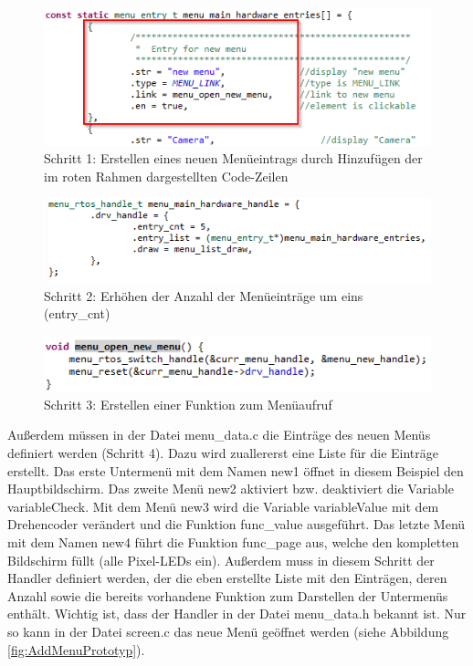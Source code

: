 \begin{figure}[H] %
\includegraphics[width=.75\textwidth]{sec6/images/AddMenu1} 
\centering
\captionsetup{width=.95\textwidth}
\caption[Schritt 1: Erstellen eines neuen Menüeintrags]{Schritt 1: Erstellen eines neuen Menüeintrags durch Hinzufügen der im roten Rahmen dargestellten Code-Zeilen}\centering
\label{fig:AddMenu1}
\end{figure}
\begin{figure}[H] %
\includegraphics[width=.75\textwidth]{sec6/images/AddMenu2} 
\centering
\captionsetup{width=.95\textwidth}
\caption[Schritt 2: Erhöhen der Anzahl der Menüeinträge um eins]{Schritt 2: Erhöhen der Anzahl der Menüeinträge um eins (entry\_cnt)}\centering
\label{fig:AddMenu2}
\end{figure}
\begin{figure}[H] %
\includegraphics[width=.75\textwidth]{sec6/images/AddMenuFunktion} 
\centering
\captionsetup{width=.95\textwidth}
\caption[Schritt 3: Erstellen einer Funktion zum Menüaufruf]{Schritt 3: Erstellen einer Funktion zum Menüaufruf}\centering
\label{fig:AddMenuFunktion}
\end{figure}

Außerdem müssen in der Datei \glqq menu\_data.c\grqq{} die Einträge des neuen Menüs definiert werden (Schritt 4). Dazu wird zuallererst eine Liste für die Einträge erstellt. Das erste Untermenü mit dem Namen \glqq new1\grqq{} öffnet in diesem Beispiel den Hauptbildschirm. Das zweite Menü \glqq new2\grqq{} aktiviert bzw. deaktiviert die Variable \glqq variableCheck\grqq{}. Mit dem Menü \glqq new3\grqq{} wird die Variable \glqq variableValue\grqq{} mit dem Drehencoder verändert und die Funktion \glqq func\_value\grqq{} ausgeführt. Das letzte Menü mit dem Namen \glqq new4\grqq{} führt die Funktion \glqq func\_page\grqq{} aus, welche den kompletten Bildschirm füllt (alle Pixel-LEDs ein). Außerdem muss in diesem Schritt der Handler definiert werden, der die eben erstellte Liste mit den Einträgen, deren Anzahl sowie die bereits vorhandene Funktion zum Darstellen der Untermenüs enthält. Wichtig ist, dass der Handler in der Datei \glqq menu\_data.h\grqq{} bekannt ist. Nur so kann in der Datei \glqq screen.c\grqq{} das neue Menü geöffnet werden (siehe Abbildung \ref{fig:AddMenuPrototyp}).

